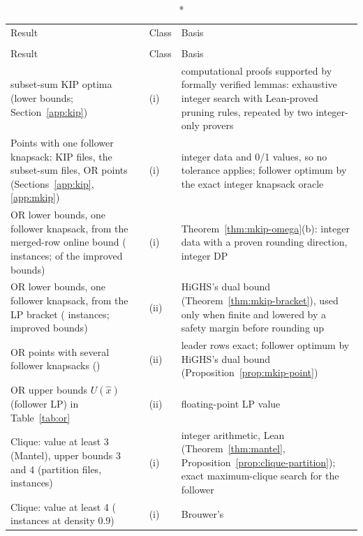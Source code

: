 {\small\setlength{\tabcolsep}{4pt}\setlength{\LTcapwidth}{\linewidth}
\begin{longtable}{@{}>{\raggedright\arraybackslash}p{2.35in}l>{\raggedright\arraybackslash}p{3.0in}@{}}
\caption*{Certificate class of each kind of result (Definition~\ref{def:classes}).}\\
\toprule
Result & Class & Basis\\
\midrule
\endfirsthead
\multicolumn{3}{@{}l}{\emph{(continued)}}\\
\toprule
Result & Class & Basis\\
\midrule
\endhead
\bottomrule
\endlastfoot
\NumNewKip{} subset-sum KIP optima (lower bounds; Section~\ref{app:kip}) & (i) &
computational proofs supported by formally verified lemmas: exhaustive integer
search with Lean-proved pruning rules, repeated by two integer-only provers\\[2pt]
Points with one follower knapsack: KIP files, the \NumNewKip{} subset-sum
files, \NumOrOneKnapsackPoints{} OR points (Sections~\ref{app:kip}, \ref{app:mkip}) & (i) &
integer data and 0/1 values, so no tolerance applies; follower optimum by the
exact integer knapsack oracle\\[2pt]
OR lower bounds, one follower knapsack, from the merged-row online bound
(\SuppOrLbOmega{} instances; \SuppOrBetterLbOmega{} of the \NumOrBetterLb{}
improved bounds) & (i) & Theorem~\ref{thm:mkip-omega}(b): integer data with a
proven rounding direction, integer DP\\[2pt]
OR lower bounds, one follower knapsack, from the LP bracket
(\SuppOrLbMilp{} instances; \SuppOrBetterLbMilp{} improved bounds) & (ii) &
HiGHS's dual bound (Theorem~\ref{thm:mkip-bracket}), used only when finite and
lowered by a safety margin before rounding up\\[2pt]
OR points with several follower knapsacks (\NumOrSeveralPoints{}) & (ii) &
leader rows exact; follower optimum by HiGHS's dual bound
(Proposition~\ref{prop:mkip-point})\\[2pt]
OR upper bounds $U(\hat x)$ (follower LP) in Table~\ref{tab:or} & (ii) &
floating-point LP value\\[2pt]
Clique: value at least 3 (Mantel), upper bounds 3 and 4 (partition files,
\NumCliqueSet{} instances) & (i) & integer arithmetic, Lean
(Theorem~\ref{thm:mantel}, Proposition~\ref{prop:clique-partition}); exact
maximum-clique search for the follower\\[2pt]
Clique: value at least 4 (\CliqueCertInstances{} instances at density 0.9) & (i) & Brouwer's

\end{longtable}}
